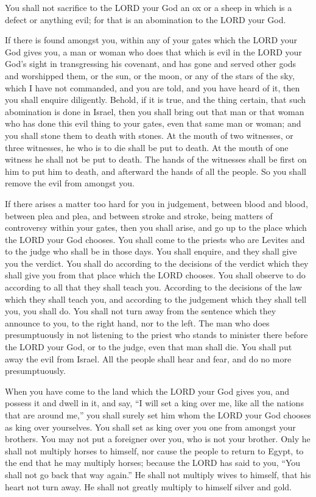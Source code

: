  You shall not sacrifice to the LORD your God an ox or a
sheep in which is a defect or anything evil; for that is an abomination
to the LORD your God.

 If there is found amongst you, within any of your gates
which the LORD your God gives you, a man or woman who does that which is
evil in the LORD your God's sight in transgressing his covenant,
 and has gone and served other gods and worshipped them, or
the sun, or the moon, or any of the stars of the sky, which I have not
commanded,  and you are told, and you have heard of it, then
you shall enquire diligently. Behold, if it is true, and the thing
certain, that such abomination is done in Israel,  then you
shall bring out that man or that woman who has done this evil thing to
your gates, even that same man or woman; and you shall stone them to
death with stones.  At the mouth of two witnesses, or three
witnesses, he who is to die shall be put to death. At the mouth of one
witness he shall not be put to death.  The hands of the
witnesses shall be first on him to put him to death, and afterward the
hands of all the people. So you shall remove the evil from amongst you.

 If there arises a matter too hard for you in judgement,
between blood and blood, between plea and plea, and between stroke and
stroke, being matters of controversy within your gates, then you shall
arise, and go up to the place which the LORD your God chooses.
 You shall come to the priests who are Levites and to the
judge who shall be in those days. You shall enquire, and they shall give
you the verdict.  You shall do according to the decisions
of the verdict which they shall give you from that place which the LORD
chooses. You shall observe to do according to all that they shall teach
you.  According to the decisions of the law which they
shall teach you, and according to the judgement which they shall tell
you, you shall do. You shall not turn away from the sentence which they
announce to you, to the right hand, nor to the left.  The
man who does presumptuously in not listening to the priest who stands to
minister there before the LORD your God, or to the judge, even that man
shall die. You shall put away the evil from Israel.  All
the people shall hear and fear, and do no more presumptuously.

 When you have come to the land which the LORD your God
gives you, and possess it and dwell in it, and say, ``I will set a king
over me, like all the nations that are around me,''  you
shall surely set him whom the LORD your God chooses as king over
yourselves. You shall set as king over you one from amongst your
brothers. You may not put a foreigner over you, who is not your brother.
 Only he shall not multiply horses to himself, nor cause
the people to return to Egypt, to the end that he may multiply horses;
because the LORD has said to you, ``You shall not go back that way
again.''  He shall not multiply wives to himself, that his
heart not turn away. He shall not greatly multiply to himself silver and
gold.

